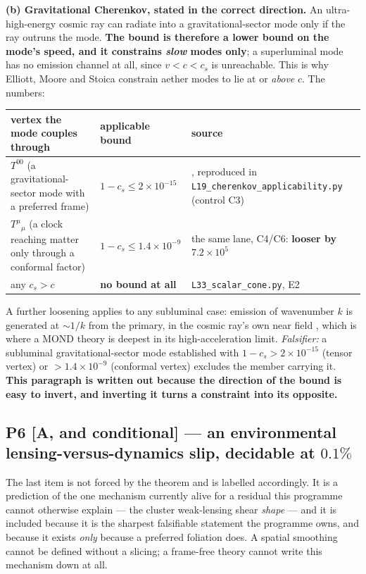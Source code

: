\documentclass[11pt,letterpaper]{article}
\begin{document}
\textbf{(b) Gravitational Cherenkov, stated in the correct direction.} An ultra-high-energy cosmic ray can radiate into a gravitational-sector mode only if the ray outruns the mode. \textbf{The bound is therefore a lower bound on the mode's speed, and it constrains \emph{slow} modes only}; a superluminal mode has no emission channel at all, since $v<c<c_s$ is unreachable. This is why Elliott, Moore and Stoica \cite{ElliottMooreStoica2005} constrain aether modes to lie at or \emph{above} $c$. The numbers:
\begin{center}\small
\begin{tabular}{L{0.36\textwidth}L{0.22\textwidth}L{0.34\textwidth}}\toprule
vertex the mode couples through & applicable bound & source\\\midrule
$T^{00}$ (a gravitational-sector mode with a preferred frame) & $1-c_s\le2\times10^{-15}$ & \cite{MooreNelson2001,ElliottMooreStoica2005}, reproduced in \texttt{L19\_cherenkov\_applicability.py} (control C3)\\
$T^\mu{}_\mu$ (a clock reaching matter only through a conformal factor) & $1-c_s\le1.4\times10^{-9}$ & the same lane, C4/C6: \textbf{looser by $7.2\times10^5$}\\
any $c_s>c$ & \textbf{no bound at all} & \texttt{L33\_scalar\_cone.py}, E2\\\bottomrule
\end{tabular}
\end{center}
A further loosening applies to any subluminal case: emission of wavenumber $k$ is generated at $\sim1/k$ from the primary, in the cosmic ray's own near field \cite{MilgromCherenkov2011}, which is where a MOND theory is deepest in its high-acceleration limit. \emph{Falsifier:} a subluminal gravitational-sector mode established with $1-c_s>2\times10^{-15}$ (tensor vertex) or $>1.4\times10^{-9}$ (conformal vertex) excludes the member carrying it. \textbf{This paragraph is written out because the direction of the bound is easy to invert, and inverting it turns a constraint into its opposite.}

\subsection{P6 [A, and conditional] --- an environmental lensing-versus-dynamics slip, decidable at $0.1\%$}

The last item is not forced by the theorem and is labelled accordingly. It is a prediction of the one mechanism currently alive for a residual this programme cannot otherwise explain --- the cluster weak-lensing shear \emph{shape} --- and it is included because it is the sharpest falsifiable statement the programme owns, and because it exists \emph{only} because a preferred foliation does. A spatial smoothing cannot be defined without a slicing; a frame-free theory cannot write this mechanism down at all.
\end{document}
